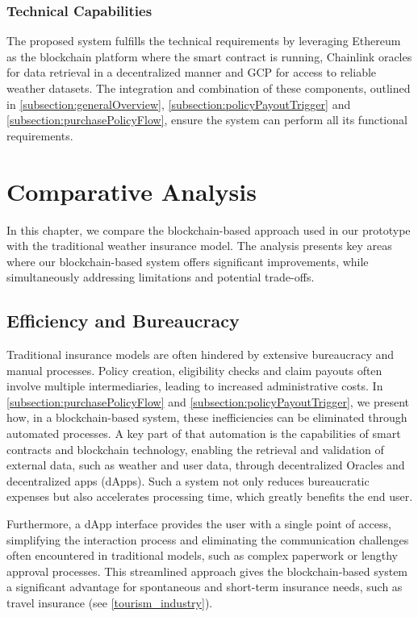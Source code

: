 \subsubsection{Technical Capabilities}
The proposed system fulfills the technical requirements by leveraging Ethereum as the blockchain platform where the smart contract is running, Chainlink oracles for data retrieval in a decentralized manner and GCP for access to reliable weather datasets. The integration and combination of these components, outlined in \cref{subsection:generalOverview}, \cref{subsection:policyPayoutTrigger} and \cref{subsection:purchasePolicyFlow}, ensure the system can perform all its functional requirements.

\section{Comparative Analysis}\label{comparitive_analysis}
In this chapter, we compare the blockchain-based approach used in our prototype with the traditional weather insurance model. The analysis presents key areas where our blockchain-based system offers significant improvements, while simultaneously addressing limitations and potential trade-offs.

\subsection{Efficiency and Bureaucracy}\label{efficiency_bureaucracy}
Traditional insurance models are often hindered by extensive bureaucracy and manual processes. Policy creation, eligibility checks and claim payouts often involve multiple intermediaries, leading to increased administrative costs. In \cref{subsection:purchasePolicyFlow} and \cref{subsection:policyPayoutTrigger}, we present how, in a blockchain-based system, these inefficiencies can be eliminated through automated processes. A key part of that automation is the capabilities of smart contracts and blockchain technology, enabling the retrieval and validation of external data, such as weather and user data, through decentralized Oracles and decentralized apps (dApps). Such a system not only reduces bureaucratic expenses but also accelerates processing time, which greatly benefits the end user.

Furthermore, a dApp interface provides the user with a single point of access, simplifying the interaction process and eliminating the communication challenges often encountered in traditional models, such as complex paperwork or lengthy approval processes. This streamlined approach gives the blockchain-based system a significant advantage for spontaneous and short-term insurance needs, such as travel insurance (see \cref{tourism_industry}).

